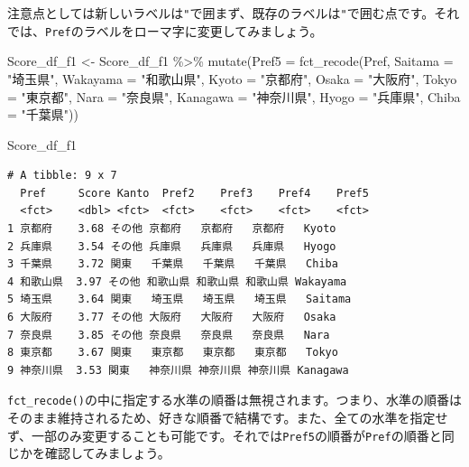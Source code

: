 \documentclass[
  a4paper,
  pandoc,
  ja=standard,
  jafont=haranoaji]{bxjsbook}
\newenvironment{Shaded}{\begin{snugshade}}{\end{snugshade}}
\newcommand{\AttributeTok}[1]{\textcolor[rgb]{0.00,0.48,0.65}{#1}}
\newcommand{\FunctionTok}[1]{\textcolor[rgb]{0.28,0.35,0.67}{#1}}
\newcommand{\NormalTok}[1]{\textcolor[rgb]{0.00,0.48,0.65}{#1}}
\newcommand{\OtherTok}[1]{\textcolor[rgb]{0.00,0.48,0.65}{#1}}
\newcommand{\SpecialCharTok}[1]{\textcolor[rgb]{0.37,0.37,0.37}{#1}}
\newcommand{\StringTok}[1]{\textcolor[rgb]{0.13,0.47,0.30}{#1}}
\begin{document}
注意点としては新しいラベルは\texttt{"}で囲まず、既存のラベルは\texttt{"}で囲む点です。それでは、\texttt{Pref}のラベルをローマ字に変更してみましょう。

\begin{Shaded}
\begin{Highlighting}[numbers=left,,]
\NormalTok{Score\_df\_f1 }\OtherTok{\textless{}{-}}\NormalTok{ Score\_df\_f1 }\SpecialCharTok{\%\textgreater{}\%}
  \FunctionTok{mutate}\NormalTok{(}\AttributeTok{Pref5 =} \FunctionTok{fct\_recode}\NormalTok{(Pref,}
                            \AttributeTok{Saitama  =} \StringTok{"埼玉県"}\NormalTok{,}
                            \AttributeTok{Wakayama =} \StringTok{"和歌山県"}\NormalTok{,}
                            \AttributeTok{Kyoto    =} \StringTok{"京都府"}\NormalTok{,}
                            \AttributeTok{Osaka    =} \StringTok{"大阪府"}\NormalTok{,}
                            \AttributeTok{Tokyo    =} \StringTok{"東京都"}\NormalTok{,}
                            \AttributeTok{Nara     =} \StringTok{"奈良県"}\NormalTok{,}
                            \AttributeTok{Kanagawa =} \StringTok{"神奈川県"}\NormalTok{,}
                            \AttributeTok{Hyogo    =} \StringTok{"兵庫県"}\NormalTok{,}
                            \AttributeTok{Chiba    =} \StringTok{"千葉県"}\NormalTok{))}

\NormalTok{Score\_df\_f1}
\end{Highlighting}
\end{Shaded}

\begin{verbatim}
# A tibble: 9 x 7
  Pref     Score Kanto  Pref2    Pref3    Pref4    Pref5   
  <fct>    <dbl> <fct>  <fct>    <fct>    <fct>    <fct>   
1 京都府    3.68 その他 京都府   京都府   京都府   Kyoto   
2 兵庫県    3.54 その他 兵庫県   兵庫県   兵庫県   Hyogo   
3 千葉県    3.72 関東   千葉県   千葉県   千葉県   Chiba   
4 和歌山県  3.97 その他 和歌山県 和歌山県 和歌山県 Wakayama
5 埼玉県    3.64 関東   埼玉県   埼玉県   埼玉県   Saitama 
6 大阪府    3.77 その他 大阪府   大阪府   大阪府   Osaka   
7 奈良県    3.85 その他 奈良県   奈良県   奈良県   Nara    
8 東京都    3.67 関東   東京都   東京都   東京都   Tokyo   
9 神奈川県  3.53 関東   神奈川県 神奈川県 神奈川県 Kanagawa
\end{verbatim}

\texttt{fct\_recode()}の中に指定する水準の順番は無視されます。つまり、水準の順番はそのまま維持されるため、好きな順番で結構です。また、全ての水準を指定せず、一部のみ変更することも可能です。それでは\texttt{Pref5}の順番が\texttt{Pref}の順番と同じかを確認してみましょう。
\end{document}
